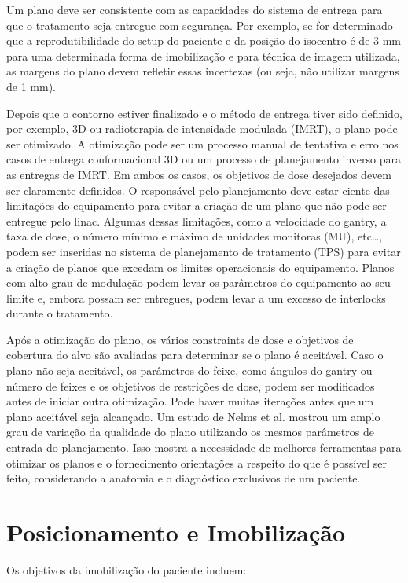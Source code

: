 \documentclass[11pt,a4paper]{article}
\newcounter{exemplo}
\begin{document}
	Um plano deve ser consistente com as capacidades do sistema de entrega para que o tratamento seja entregue com segurança. Por exemplo, se for determinado que a reprodutibilidade do setup do paciente e da posição do isocentro é de 3 mm para uma determinada forma de imobilização e para técnica de imagem utilizada, as margens do plano devem refletir essas incertezas (ou seja, não utilizar margens de 1 mm).

	Depois que o contorno estiver finalizado e o método de entrega tiver sido definido, por exemplo, 3D ou radioterapia de intensidade modulada (IMRT), o plano pode ser otimizado. A otimização pode ser um processo manual de tentativa e erro nos casos de entrega conformacional 3D ou um processo de planejamento inverso para as entregas de IMRT. Em ambos os casos, os objetivos de dose desejados devem ser claramente definidos. O responsável pelo planejamento deve estar ciente das limitações do equipamento para evitar a criação de um plano que não pode ser entregue pelo linac. Algumas dessas limitações, como a velocidade do gantry, a taxa de dose, o número mínimo e máximo de unidades monitoras (MU), etc\dots,  podem ser inseridas no sistema de planejamento de tratamento (TPS) para evitar a criação de planos que excedam os limites operacionais do equipamento. Planos com alto grau de modulação podem levar os parâmetros do equipamento ao seu limite e, embora possam ser entregues, podem levar a um excesso de interlocks durante o tratamento.

	Após a otimização do plano, os vários constraints de dose e objetivos de cobertura do alvo são avaliadas para determinar se o plano é aceitável. Caso o plano não seja aceitável, os parâmetros do feixe, como ângulos do gantry ou número de feixes e os objetivos de restrições de dose, podem ser modificados antes de iniciar outra otimização. Pode haver muitas iterações antes que um plano aceitável seja alcançado. Um estudo de Nelms et al. mostrou um amplo grau de variação da qualidade do plano utilizando os mesmos parâmetros de entrada do planejamento. Isso mostra a necessidade de melhores ferramentas para otimizar os planos e o fornecimento orientações a respeito do que é possível ser feito, considerando a anatomia e o diagnóstico exclusivos de um paciente.

\section{Posicionamento e Imobilização}

	Os objetivos da imobilização do paciente incluem:
\end{document}
